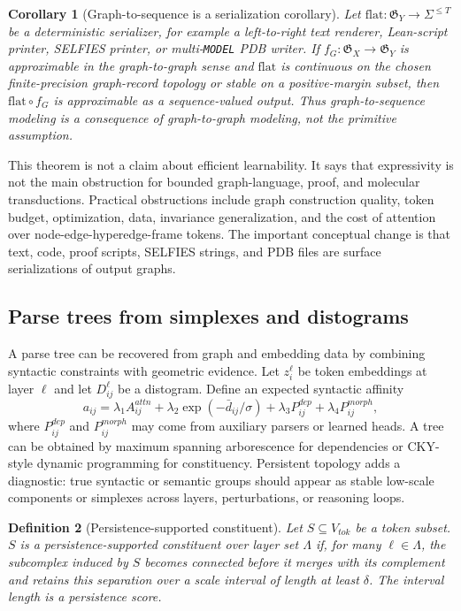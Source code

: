 \documentclass[11pt]{article}
\newtheorem{definition}{Definition}[section]
\newtheorem{corollary}[definition]{Corollary}
\newcommand{\1}{\mathbf{1}}
\begin{document}
\begin{corollary}[Graph-to-sequence is a serialization corollary]
Let \(\mathrm{flat}:\mathfrak G_Y\to\Sigma^{\le T}\) be a deterministic serializer, for example a left-to-right text renderer, Lean-script printer, SELFIES printer, or multi-\texttt{MODEL} PDB writer. If \(f_G:\mathfrak G_X\to\mathfrak G_Y\) is approximable in the graph-to-graph sense and \(\mathrm{flat}\) is continuous on the chosen finite-precision graph-record topology or stable on a positive-margin subset, then \(\mathrm{flat}\circ f_G\) is approximable as a sequence-valued output. Thus graph-to-sequence modeling is a consequence of graph-to-graph modeling, not the primitive assumption.
\end{corollary}

This theorem is not a claim about efficient learnability. It says that expressivity is not the main obstruction for bounded graph-language, proof, and molecular transductions. Practical obstructions include graph construction quality, token budget, optimization, data, invariance generalization, and the cost of attention over node-edge-hyperedge-frame tokens. The important conceptual change is that text, code, proof scripts, SELFIES strings, and PDB files are surface serializations of output graphs.

\subsection{Parse trees from simplexes and distograms}

A parse tree can be recovered from graph and embedding data by combining syntactic constraints with geometric evidence. Let $z_i^\ell$ be token embeddings at layer $\ell$ and let $D_{ij}^\ell$ be a distogram. Define an expected syntactic affinity
\[
a_{ij}=\lambda_1 A_{ij}^{attn}+\lambda_2 \exp(-\bar d_{ij}/\sigma)+\lambda_3 P_{ij}^{dep}+\lambda_4 P_{ij}^{morph},
\]
where $P_{ij}^{dep}$ and $P_{ij}^{morph}$ may come from auxiliary parsers or learned heads. A tree can be obtained by maximum spanning arborescence for dependencies or CKY-style dynamic programming for constituency. Persistent topology adds a diagnostic: true syntactic or semantic groups should appear as stable low-scale components or simplexes across layers, perturbations, or reasoning loops.

\begin{definition}[Persistence-supported constituent]
Let $S\subseteq V_{tok}$ be a token subset. $S$ is a persistence-supported constituent over layer set $\Lambda$ if, for many $\ell\in\Lambda$, the subcomplex induced by $S$ becomes connected before it merges with its complement and retains this separation over a scale interval of length at least $\delta$. The interval length is a persistence score.
\end{definition}
\end{document}
